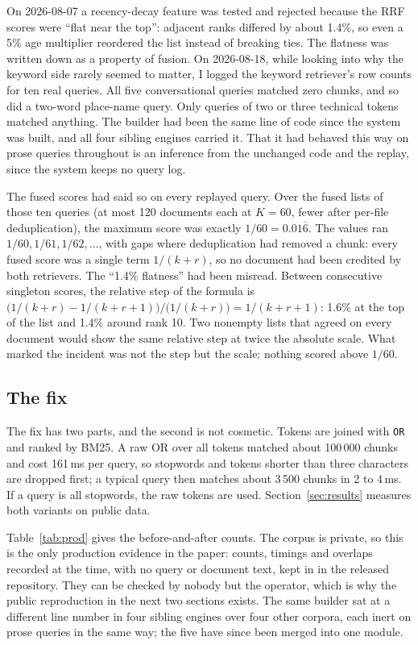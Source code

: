 \documentclass[11pt]{article}
\begin{document}
On 2026-08-07 a recency-decay feature was tested and rejected because the RRF scores were ``flat near the top'': adjacent ranks differed by about 1.4\%, so even a 5\% age multiplier reordered the list instead of breaking ties. The flatness was written down as a property of fusion. On 2026-08-18, while looking into why the keyword side rarely seemed to matter, I logged the keyword retriever's row counts for ten real queries. All five conversational queries matched zero chunks, and so did a two-word place-name query. Only queries of two or three technical tokens matched anything. The builder had been the same line of code since the system was built, and all four sibling engines carried it. That it had behaved this way on prose queries throughout is an inference from the unchanged code and the replay, since the system keeps no query log.

The fused scores had said so on every replayed query. Over the fused lists of those ten queries (at most 120 documents each at $K = 60$, fewer after per-file deduplication), the maximum score was exactly $1/60 = 0.01\overline{6}$. The values ran $1/60, 1/61, 1/62, \ldots$, with gaps where deduplication had removed a chunk: every fused score was a single term $1/(k+r)$, so no document had been credited by both retrievers. The ``1.4\% flatness'' had been misread. Between consecutive singleton scores, the relative step of the formula is $\bigl(1/(k+r) - 1/(k+r+1)\bigr) / \bigl(1/(k+r)\bigr) = 1/(k+r+1)$: 1.6\% at the top of the list and 1.4\% around rank 10. Two nonempty lists that agreed on every document would show the same relative step at twice the absolute scale. What marked the incident was not the step but the scale: nothing scored above $1/60$.

\subsection{The fix}
\label{sec:fix}

The fix has two parts, and the second is not cosmetic. Tokens are joined with \verb|OR| and ranked by BM25. A raw OR over all tokens matched about 100\,000 chunks and cost 161\,ms per query, so stopwords and tokens shorter than three characters are dropped first; a typical query then matches about 3\,500 chunks in 2 to 4\,ms. If a query is all stopwords, the raw tokens are used. Section~\ref{sec:results} measures both variants on public data.

Table~\ref{tab:prod} gives the before-and-after counts. The corpus is private, so this is the only production evidence in the paper: counts, timings and overlaps recorded at the time, with no query or document text, kept in  in the released repository. They can be checked by nobody but the operator, which is why the public reproduction in the next two sections exists. The same builder sat at a different line number in four sibling engines over four other corpora, each inert on prose queries in the same way; the five have since been merged into one module.
\end{document}
